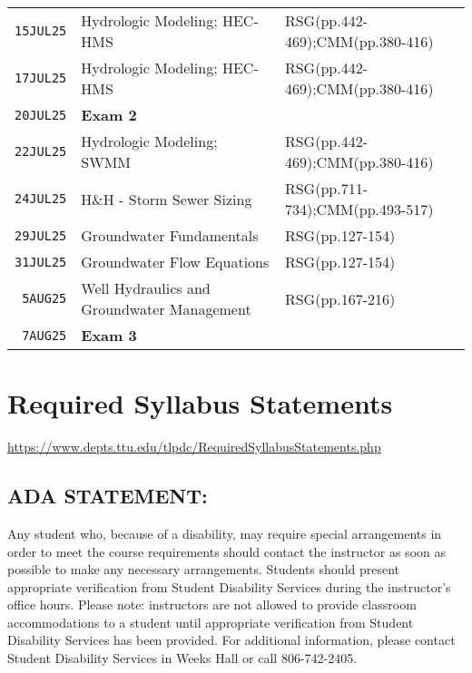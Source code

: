 \documentclass[12pt]{article}
\begin{document}
\begin{table}[ht!]
\begin{tabular}{p{0.5in}p{3.0in}p{3.0in}}
\texttt{15JUL25} & Hydrologic Modeling; HEC-HMS & RSG(pp.442-469);CMM(pp.380-416) \\  %
\texttt{17JUL25} & Hydrologic Modeling; HEC-HMS & RSG(pp.442-469);CMM(pp.380-416)\\ 
\texttt{20JUL25} & \textbf{Exam 2} &  \\ %
\texttt{22JUL25} & Hydrologic Modeling; SWMM & RSG(pp.442-469);CMM(pp.380-416) \\ %
\texttt{24JUL25} & H\&H - Storm Sewer Sizing &RSG(pp.711-734);CMM(pp.493-517)  \\  
\texttt{29JUL25} & Groundwater Fundamentals & RSG(pp.127-154)\\
\texttt{31JUL25} & Groundwater Flow Equations & RSG(pp.127-154)  \\ %
\texttt{~5AUG25} & Well Hydraulics and Groundwater Management &  RSG(pp.167-216) \\  
\texttt{~7AUG25} & \textbf{Exam 3} &  \\ %
\hline
   \end{tabular}
   \label{tab:schedule}
\end{table}


\clearpage
\clearpage
%

\section*{Required Syllabus Statements}
\url{https://www.depts.ttu.edu/tlpdc/RequiredSyllabusStatements.php}
\subsection*{ADA STATEMENT:}
Any student who, because of a disability, may require special arrangements in order to meet the course requirements should contact the instructor as soon as possible to make any necessary arrangements. Students should present appropriate verification from Student Disability Services during the instructor's office hours. Please note: instructors are not allowed to provide classroom accommodations to a student until appropriate verification from Student Disability Services has been provided. For additional information, please contact Student Disability Services in Weeks Hall or call 806-742-2405.
\end{document}
